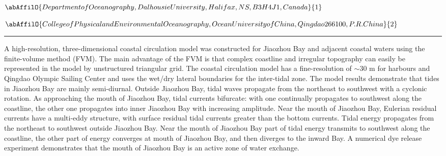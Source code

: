 \begin{minipage}{\linewidth}\begin{center}\begin{minipage}{\linewidth}
   \vspace{2 mm} \begin{center}
    \vspace{2 mm}\begin{center}
  
  $\abAffilO{Department of Oceanography, Dalhousie University, Halifax, NS, B3H 4J1, Canada}{1}$

  
  $\abAffilO{College of Physical and Environmental Oceanography, Ocean University of China, Qingdao 266100, P. R. China}{2}$

  \end{center}
  \vspace{2 mm}
  \end{center}\end{minipage}\end{center}
  \begin{center}\rule{0.70\linewidth}{0.5 pt}\end{center}
  \begin{minipage}{\linewidth}
\noindent A high-resolution, three-dimensional coastal circulation model was constructed for Jiaozhou Bay and adjacent coastal waters using the finite-volume method (FVM). The main advantage of the FVM is that complex coastline and irregular topography can easily be represented in the model by unstructured triangular grid. The coastal circulation model has a fine-resolution of $\sim$30 m for harbours and Qingdao Olympic Sailing Center and uses the wet/dry lateral boundaries for the inter-tidal zone. The model results demonstrate that tides in Jiaozhou Bay are mainly semi-diurnal. Outside Jiaozhou Bay, tidal waves propagate from the northeast to southwest with a cyclonic rotation. As approaching the mouth of Jiaozhou Bay, tidal currents bifurcate: with one continually propagates to southwest along the coastline, the other one propagates into inner Jiaozhou Bay with increasing amplitude. Near the mouth of Jiaozhou Bay, Eulerian residual currents have a multi-eddy structure, with surface residual tidal currents greater than the bottom currents. Tidal energy propagates from the northeast to southwest outside Jiaozhou Bay. Near the mouth of Jiaozhou Bay part of tidal energy transmits to southwest along the coastline, the other part of energy converges at mouth of Jiaozhou Bay, and then diverges to the inward Bay. A numerical dye release experiment demonstrates that the mouth of Jiaozhou Bay is an active zone of water exchange.
\end{minipage}\end{minipage}

